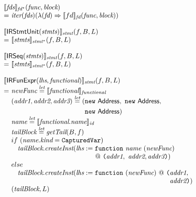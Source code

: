 \[\begin{array}{l@{}l@{~}l}
\lefteqn{\transfun{\emph{fds}}_{\emph{fd}^{*}}(\emph{func}, \emph{block})}\\
& = & \iter(\emph{fds})(\lambda(\emph{fd}) \Rightarrow \transfun{fd}_{\emph{fd}}(\emph{func}, \emph{block}))\\
& & \\

\lefteqn{\transfun{\irstmtunit{\emph{stmts}}}_{\emph{stmt}}(f, B, L)}\\
 & = &
\transfun{\emph{stmts}}_{\emph{stmt}^{*}}(f, B, L)\\
& & \\

\lefteqn{\transfun{\irseq{\emph{stmts}}}_{\emph{stmt}}(f, B, L)}\\
 & = &
\transfun{\emph{stmts}}_{\emph{stmt}^{*}}(f, B, L)\\
& & \\

\lefteqn{\transfun{\SF{IRFunExpr}(\emph{lhs}, \emph{functional})}_{\emph{stmt}}(f, B, L)}\\
& = & \emph{newFunc} \letval \transfun{\emph{functional}}_{\emph{functional}}\\
& & (\emph{addr1}, \emph{addr2}, \emph{addr3}) \letval (\new\ \Address,\ \new\ \Address,\\
& & \phantom{(\emph{addr1}, \emph{addr2}, \emph{addr3}) \letval (}\new\ \Address)\\
& & \emph{name} \letval \transfun{\emph{functional}.\emph{name}}_{\emph{id}}\\
& & \emph{tailBlock} \letval \getTail(B, f)\\
& & if\ (\emph{name}.\emph{kind} = \TT{CapturedVar}) \\
& & \phantom{if} \emph{tailBlock}.\emph{createInst}(\emph{lhs} := \TT{function}\ \emph{name}\ (\emph{newFunc}) \\
& & \phantom{if \emph{tailBlock}.\emph{createInst}(\emph{lhs} :=}
~@~ \TT{(}\emph{addr1},\ \emph{addr2}, \emph{addr3}\TT{)})\\
& & else\\
& & \phantom{if} \emph{tailBlock}.\emph{createInst}(\emph{lhs} := \TT{function}\ (\emph{newFunc}) ~@~
\TT{(} \emph{addr1},\\
& & \phantom{if \emph{tailBlock}.\emph{createInst}(\emph{lhs} := \TT{function}\ (\emph{newFunc}) ~@~ \TT{(}}\emph{addr2}\TT{)})\\
& & (\emph{tailBlock}, L)\\
& & \\
\end{array}
\]

